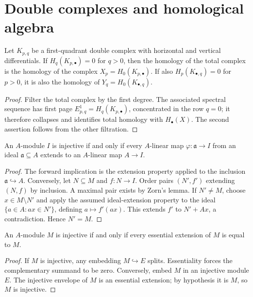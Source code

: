 \section{Double complexes and homological algebra}

\begin{theorem}
\label{mcrt-thm-b-1}
\uses{}
Let $K_{p,q}$ be a first-quadrant double complex with horizontal and vertical
differentials.  If $H_q(K_{p,\bullet})=0$ for $q>0$, then the homology of the
total complex is the homology of the complex
$X_p=H_0(K_{p,\bullet})$.  If also $H_p(K_{\bullet,q})=0$ for $p>0$, it is
also the homology of $Y_q=H_0(K_{\bullet,q})$.
\end{theorem}
\begin{proof}
Filter the total complex by the first degree.  The associated spectral sequence
has first page $E^1_{p,q}=H_q(K_{p,\bullet})$, concentrated in the row $q=0$;
it therefore collapses and identifies total homology with $H_\bullet(X)$.
The second assertion follows from the other filtration.
\end{proof}

\begin{theorem}
\label{mcrt-thm-b-3}
\uses{}
An $A$-module $I$ is injective if and only if every $A$-linear map
$\varphi:\mathfrak a\to I$ from an ideal $\mathfrak a\subseteq A$ extends to an
$A$-linear map $A\to I$.
\end{theorem}
\begin{proof}
The forward implication is the extension property applied to the inclusion
$\mathfrak a\hookrightarrow A$.  Conversely, let $N\subseteq M$ and
$f:N\to I$.  Order pairs $(N',f')$ extending $(N,f)$ by inclusion.  A maximal
pair exists by Zorn's lemma.  If $N'\ne M$, choose $x\in M\setminus N'$ and
apply the assumed ideal-extension property to the ideal
$\{a\in A:ax\in N'\}$, defining $a\mapsto f'(ax)$.  This extends $f'$ to
$N'+Ax$, a contradiction.  Hence $N'=M$.
\end{proof}

\begin{theorem}
\label{mcrt-thm-b-4}
\uses{}
An $A$-module $M$ is injective if and only if every essential extension of
$M$ is equal to $M$.
\end{theorem}
\begin{proof}
If $M$ is injective, any embedding $M\hookrightarrow E$ splits.  Essentiality
forces the complementary summand to be zero.  Conversely, embed $M$ in an
injective module $E$.  The injective envelope of $M$ is an essential extension;
by hypothesis it is $M$, so $M$ is injective.
\end{proof}
